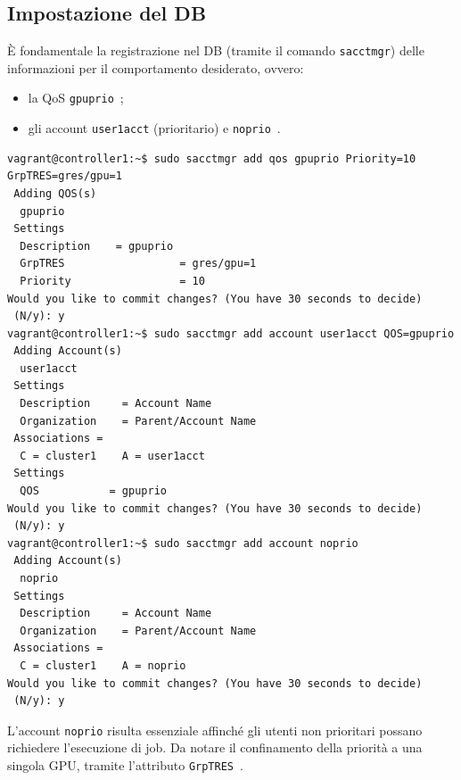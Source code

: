 \documentclass[12pt,a4paper,twoside,openright]{book}
\begin{document}
\subsection{Impostazione del DB}
È fondamentale la registrazione nel \ac{DB} (tramite il comando \texttt{sacctmgr}) delle informazioni per il comportamento desiderato, ovvero:
\begin{itemize}
    \item la \ac{QoS} \texttt{gpuprio}~\cite{slurmqos};
    \item gli account \texttt{user1acct} (prioritario) e \texttt{noprio}~\cite{slurmaccounting}.
\end{itemize}
\begin{verbatim}
vagrant@controller1:~$ sudo sacctmgr add qos gpuprio Priority=10 GrpTRES=gres/gpu=1
 Adding QOS(s)
  gpuprio
 Settings
  Description    = gpuprio
  GrpTRES                  = gres/gpu=1
  Priority                 = 10
Would you like to commit changes? (You have 30 seconds to decide)
 (N/y): y
vagrant@controller1:~$ sudo sacctmgr add account user1acct QOS=gpuprio
 Adding Account(s)
  user1acct
 Settings
  Description     = Account Name
  Organization    = Parent/Account Name
 Associations =
  C = cluster1    A = user1acct
 Settings
  QOS           = gpuprio
Would you like to commit changes? (You have 30 seconds to decide)
 (N/y): y
vagrant@controller1:~$ sudo sacctmgr add account noprio
 Adding Account(s)
  noprio
 Settings
  Description     = Account Name
  Organization    = Parent/Account Name
 Associations =
  C = cluster1    A = noprio
Would you like to commit changes? (You have 30 seconds to decide)
 (N/y): y
\end{verbatim}
L'account \texttt{noprio} risulta essenziale affinché gli utenti non prioritari possano richiedere l'esecuzione di job. Da notare il confinamento della priorità a una singola \ac{GPU}, tramite l'attributo \texttt{GrpTRES}~\cite{slurmlimits}.
\end{document}
